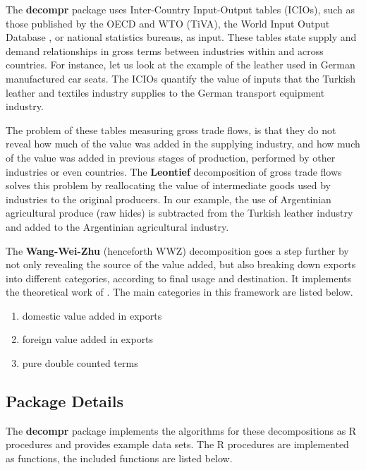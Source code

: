 \documentclass[a4paper]{article}\usepackage[]{graphicx}\usepackage[]{color}
\begin{document}
The \textbf{decompr} package uses Inter-Country Input-Output tables (ICIOs), such as those published by the OECD and WTO (TiVA), %
the World Input Output Database \parencite{timmer2012world},  or national statistics bureaus, as input.
These tables state supply and demand relationships in gross terms between industries within and across countries.
For instance, let us look at the example of the leather used in German manufactured car seats.
The ICIOs quantify the value of inputs that the Turkish leather and textiles industry
supplies to the German transport equipment industry.

The problem of these tables measuring gross trade flows, 
is that they do not reveal how much of the value was added in the supplying industry,
and how much of the value was added in previous stages of production, performed by other industries or even countries.
The \textbf{Leontief} decomposition of gross trade flows solves this problem by reallocating the value of intermediate goods used by industries to the original producers.
In our example, the use of Argentinian agricultural produce (raw hides) is subtracted from the Turkish leather industry and added to the Argentinian agricultural industry.

The \textbf{Wang-Wei-Zhu} (henceforth WWZ) decomposition goes a step further by not only revealing the source of the value added,
but also breaking down exports into different categories, according to final usage and destination.
It implements the theoretical work of \textcite{wang2014quantifying}.
The main categories in this framework are listed below.

\begin{enumerate}
 \item domestic value added in exports
 \item foreign value added in exports
 \item pure double counted terms
\end{enumerate}

\subsection{Package Details}
The \textbf{decompr} package implements the algorithms for these decompositions as R procedures and provides example data sets.
The R procedures are implemented as functions, the included functions are listed below.
\end{document}
